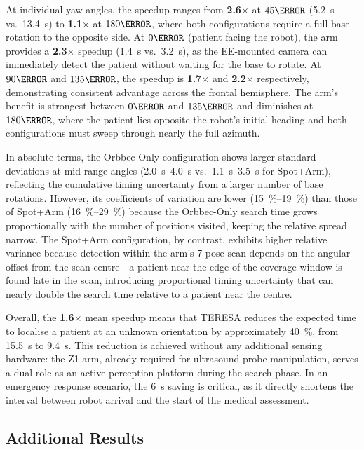 At individual yaw angles, the speedup ranges from \textbf{2.6}$\times$ at
$45\degree$ (\SI{5.2}{\second} vs.\ \SI{13.4}{\second}) to \textbf{1.1}$\times$
at $180\degree$, where both configurations require a full base rotation to
the opposite side. At $0\degree$ (patient facing the robot), the arm provides
a \textbf{2.3}$\times$ speedup (\SI{1.4}{\second} vs.\ \SI{3.2}{\second}),
as the \ac{EE}-mounted camera can immediately detect the patient without
waiting for the base to rotate. At $90\degree$ and $135\degree$, the speedup
is \textbf{1.7}$\times$ and \textbf{2.2}$\times$ respectively, demonstrating
consistent advantage across the frontal hemisphere. The arm's benefit is
strongest between $0\degree$ and $135\degree$ and diminishes at $180\degree$,
where the patient lies opposite the robot's initial heading and both
configurations must sweep through nearly the full azimuth.

In absolute terms, the Orbbec-Only configuration shows larger standard
deviations at mid-range angles (\SI{2.0}{\second}--\SI{4.0}{\second} vs.\
\SI{1.1}{\second}--\SI{3.5}{\second} for Spot+Arm), reflecting the
cumulative timing uncertainty from a larger number of base rotations.
However, its coefficients of variation are lower
(\SI{15}{\percent}--\SI{19}{\percent}) than those of Spot+Arm
(\SI{16}{\percent}--\SI{29}{\percent}) because the Orbbec-Only search time
grows proportionally with the number of positions visited, keeping the
relative spread narrow.  The Spot+Arm configuration, by contrast, exhibits
higher relative variance because detection within the arm's 7-pose scan
depends on the angular offset from the scan centre---a patient near the edge
of the coverage window is found late in the scan, introducing proportional
timing uncertainty that can nearly double the search time relative to a
patient near the centre.

Overall, the \textbf{1.6}$\times$ mean speedup means that \ac{TERESA}
reduces the expected time to localise a patient at an unknown orientation by
approximately \SI{40}{\percent}, from \SI{15.5}{\second} to
\SI{9.4}{\second}. This reduction is achieved without any additional sensing
hardware: the Z1 arm, already required for ultrasound probe manipulation,
serves a dual role as an active perception platform during the search phase.
In an emergency response scenario, the \SI{6}{\second} saving is critical,
as it directly shortens the interval between robot arrival and the start of
the medical assessment.

\subsection{Additional Results}



